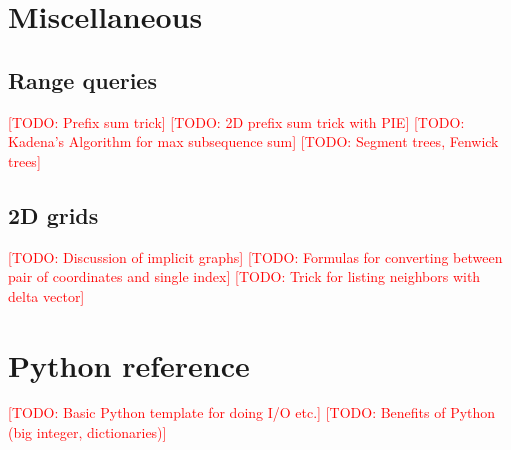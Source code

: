 \documentclass[10pt]{book}
\newcommand{\todo}[1]{\textcolor{red}{[TODO: #1]}}
\begin{document}
\chapter{Miscellaneous}

\section{Range queries}

\todo{Prefix sum trick}
\todo{2D prefix sum trick with PIE}
\todo{Kadena's Algorithm for max subsequence sum}
\todo{Segment trees, Fenwick trees}

\section{2D grids}

\todo{Discussion of implicit graphs}
\todo{Formulas for converting between pair of coordinates and single index}
\todo{Trick for listing neighbors with delta vector}

\chapter{Python reference}

\todo{Basic Python template for doing I/O etc.}
\todo{Benefits of Python (big integer, dictionaries)}
\end{document}
